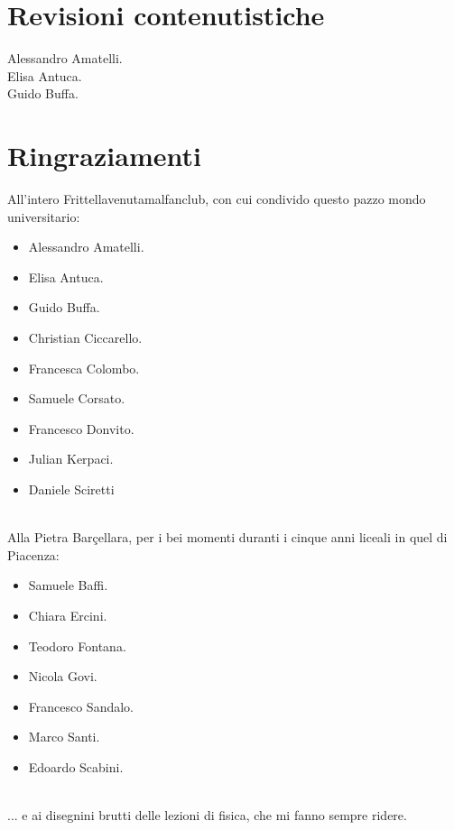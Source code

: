 \section*{Revisioni contenutistiche}
Alessandro Amatelli.\\
Elisa Antuca.\\
Guido Buffa.

\section*{Ringraziamenti}
All'intero Frittellavenutamalfanclub, con cui condivido questo pazzo mondo universitario:
\begin{itemize}
	\item Alessandro Amatelli.
	\item Elisa Antuca.
	\item Guido Buffa.
	\item Christian Ciccarello.
	\item Francesca Colombo.
	\item Samuele Corsato.
	\item Francesco Donvito.
	\item Julian Kerpaci.
	\item Daniele Sciretti
\end{itemize}~\\
Alla Pietra Barçellara, per i bei momenti duranti i cinque anni liceali in quel di Piacenza:
\begin{itemize}
	\item Samuele Baffi.
	\item Chiara Ercini.
	\item Teodoro Fontana.
	\item Nicola Govi.
	\item Francesco Sandalo.
	\item Marco Santi.
	\item Edoardo Scabini.
\end{itemize}~\\
... e ai disegnini brutti delle lezioni di fisica, che mi fanno sempre ridere.